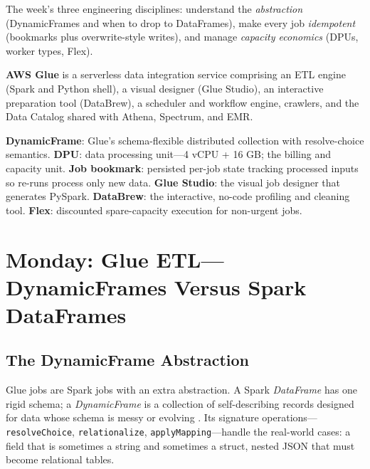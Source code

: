 The week's three engineering disciplines: understand the \emph{abstraction} (DynamicFrames and when to drop to DataFrames), make every job \emph{idempotent} (bookmarks plus overwrite-style writes), and manage \emph{capacity economics} (DPUs, worker types, Flex).

\begin{definitionbox}
\textbf{AWS Glue} is a serverless data integration service comprising an ETL engine (Spark and Python shell), a visual designer (Glue Studio), an interactive preparation tool (DataBrew), a scheduler and workflow engine, crawlers, and the Data Catalog shared with Athena, Spectrum, and EMR.
\end{definitionbox}

\begin{keyterms}
\textbf{DynamicFrame}: Glue's schema-flexible distributed collection with resolve-choice semantics. \textbf{DPU}: data processing unit---4 vCPU + 16 GB; the billing and capacity unit. \textbf{Job bookmark}: persisted per-job state tracking processed inputs so re-runs process only new data. \textbf{Glue Studio}: the visual job designer that generates PySpark. \textbf{DataBrew}: the interactive, no-code profiling and cleaning tool. \textbf{Flex}: discounted spare-capacity execution for non-urgent jobs.
\end{keyterms}

\section{Monday: Glue ETL---DynamicFrames Versus Spark DataFrames}
\subsection{The DynamicFrame Abstraction}
Glue jobs are Spark jobs with an extra abstraction. A Spark \emph{DataFrame} has one rigid schema; a \emph{DynamicFrame} is a collection of self-describing records designed for data whose schema is messy or evolving \cite{awsGlueDocs}. Its signature operations---\texttt{resolveChoice}, \texttt{relationalize}, \texttt{applyMapping}---handle the real-world cases: a field that is sometimes a string and sometimes a struct, nested JSON that must become relational tables.

